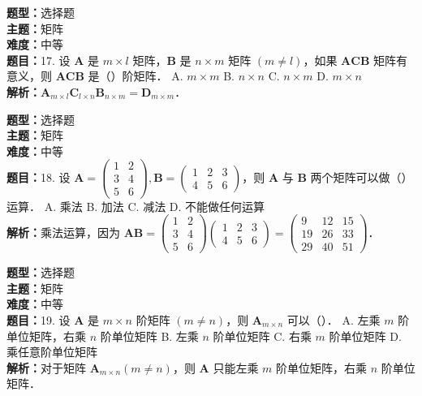 \documentclass{ctexart}
\newenvironment{question}[5]{%
	\noindent\textbf{题型：}#1\\
	\textbf{主题：}#2\\
	\textbf{难度：}#3\\
	\textbf{题目：}#4\\
	\textbf{解析：}#5\\
	\vspace{1em}
}{}
\begin{document}
	\begin{question}
		{选择题}
		{矩阵}
		{中等}
		{17. 设 \(\mathbf{A}\) 是 \(m \times l\) 矩阵，\(\mathbf{B}\) 是 \(n \times m\) 矩阵 \((m \neq l)\)，如果 \(\mathbf{A C B}\) 矩阵有意义，则 \(\mathbf{A C B}\) 是（）阶矩阵．
			A. \(m \times m\)
			B. \(n \times n\)
			C. \(n \times m\)
			D. \(m \times n\)}
		{\(\mathbf{A}_{m \times l} \mathbf{C}_{l \times n} \mathbf{B}_{n \times m}=\mathbf{D}_{m \times m}\)．}
	\end{question}
	
	\begin{question}
		{选择题}
		{矩阵}
		{中等}
		{18. 设 \(\mathbf{A}=\left(\begin{array}{ll}1 & 2 \\ 3 & 4 \\ 5 & 6\end{array}\right), \mathbf{B}=\left(\begin{array}{lll}1 & 2 & 3 \\ 4 & 5 & 6\end{array}\right)\)，则 \(\mathbf{A}\) 与 \(\mathbf{B}\) 两个矩阵可以做（）运算．
			A. 乘法
			B. 加法
			C. 减法
			D. 不能做任何运算}
		{乘法运算，因为 \(\mathbf{A B}=\left(\begin{array}{cc}1 & 2 \\ 3 & 4 \\ 5 & 6\end{array}\right)\left(\begin{array}{ccc}1 & 2 & 3 \\ 4 & 5 & 6\end{array}\right)=\left(\begin{array}{ccc}9 & 12 & 15 \\ 19 & 26 & 33 \\ 29 & 40 & 51\end{array}\right)\)．}
	\end{question}
	
	\begin{question}
		{选择题}
		{矩阵}
		{中等}
		{19. 设 \(\mathbf{A}\) 是 \(m \times n\) 阶矩阵 \((m \neq n)\)，则 \(\mathbf{A}_{m \times n}\) 可以（）．
			A. 左乘 \(m\) 阶单位矩阵，右乘 \(n\) 阶单位矩阵
			B. 左乘 \(n\) 阶单位矩阵
			C. 右乘 \(m\) 阶单位矩阵
			D. 乘任意阶单位矩阵}
		{对于矩阵 \(\mathbf{A}_{m \times n}(m \neq n)\)，则 \(\mathbf{A}\) 只能左乘 \(m\) 阶单位矩阵，右乘 \(n\) 阶单位矩阵．}
	\end{question}
	
\end{document}
